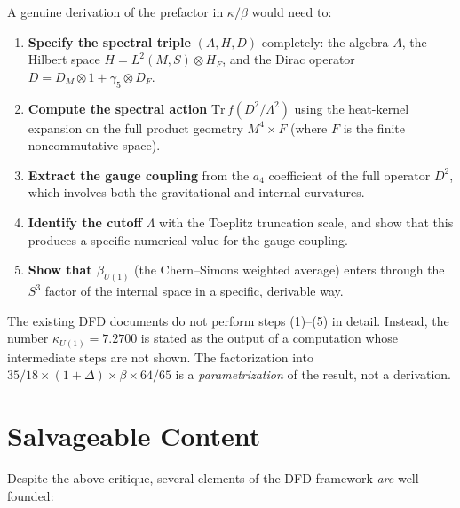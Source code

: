 \documentclass[12pt,a4paper]{article}
\theoremstyle{definition}
\begin{document}
A genuine derivation of the prefactor in $\kappa/\beta$ would need to:

\begin{enumerate}
\item \textbf{Specify the spectral triple} $(A, H, D)$ completely:
  the algebra $A$, the Hilbert space $H = L^2(M, S) \otimes H_F$,
  and the Dirac operator $D = D_M \otimes 1 + \gamma_5 \otimes D_F$.

\item \textbf{Compute the spectral action} $\mathrm{Tr}\,f(D^2/\Lambda^2)$
  using the heat-kernel expansion on the full product geometry
  $M^4 \times F$ (where $F$ is the finite noncommutative space).

\item \textbf{Extract the gauge coupling} from the $a_4$ coefficient
  of the full operator $D^2$, which involves both the gravitational
  and internal curvatures.

\item \textbf{Identify the cutoff} $\Lambda$ with the Toeplitz
  truncation scale, and show that this produces a specific numerical
  value for the gauge coupling.

\item \textbf{Show that $\beta_{U(1)}$} (the Chern--Simons weighted
  average) enters through the $S^3$ factor of the internal space
  in a specific, derivable way.
\end{enumerate}

The existing DFD documents do not perform steps (1)--(5) in detail.
Instead, the number $\kappa_{U(1)} = 7.2700$ is stated as the output
of a computation whose intermediate steps are not shown.  The
factorization into $35/18 \times (1+\Delta) \times \beta \times 64/65$
is a \emph{parametrization} of the result, not a derivation.

\section{Salvageable Content}
\label{sec:salvage}

Despite the above critique, several elements of the DFD framework
\emph{are} well-founded:
\end{document}
